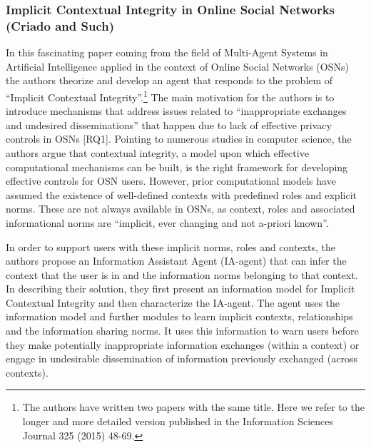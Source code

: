 \documentclass[../thesis.tex]{subfiles}
\begin{document}
\subsubsection{Implicit Contextual Integrity in Online Social Networks (Criado
  and Such)}
\label{CI3.3.3}

In this fascinating paper coming from the field of Multi-Agent Systems
in Artificial Intelligence applied in the context of Online Social
Networks (OSNs) the authors theorize and develop an agent that responds
to the problem of ``Implicit Contextual
Integrity''.\footnote{ The authors have written two
papers with the same title. Here we refer to the longer and more
detailed version published in the Information Sciences Journal 325
(2015) 48-69. } The main motivation for the authors is to introduce
mechanisms that address issues related to
``inappropriate exchanges and undesired
disseminations'' that happen due to lack of effective
privacy controls in OSNs [RQ1]. Pointing to numerous studies in
computer science, the authors argue that contextual integrity, a model
upon which effective computational mechanisms can be built, is the
right framework for developing effective controls for OSN users.
However, prior computational models have assumed the existence of
well-defined contexts with predefined roles and explicit norms. These
are not always available in OSNs, as context, roles and associated
informational norms are ``implicit, ever changing and
not a-priori known''.

In order to support users with these implicit norms, roles and contexts,
the authors propose an Information Assistant Agent (IA-agent) that can
infer the context that the user is in and the information norms
belonging to that context. In describing their solution, they first
present an information model for Implicit Contextual Integrity and then
characterize the IA-agent. The agent uses the information model and
further modules to learn implicit contexts, relationships and the
information sharing norms. It uses this information to warn users
before they make potentially inappropriate information exchanges
(within a context) or engage in undesirable dissemination of
information previously exchanged (across contexts). 
\end{document}
